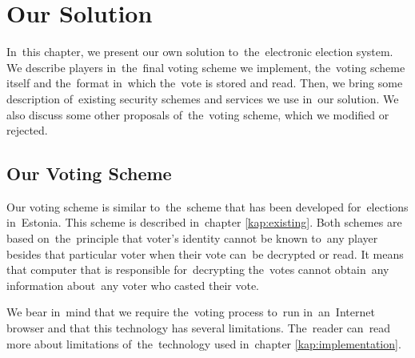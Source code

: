 \chapter{Our Solution}
\label{kap:solution}
In~this chapter, we present our own solution to~the~electronic election system. We describe players in~the~final voting scheme we implement, the~voting scheme itself and the~format in~which the~vote is stored and read. Then, we bring some description of~existing security schemes and services we use in~our solution. We also discuss some other proposals of~the~voting scheme, which we modified or rejected. 

\section{Our Voting Scheme}
Our voting scheme is similar to~the~scheme that has been developed for~elections in~Estonia. This scheme is described in~chapter \ref{kap:existing}. Both schemes are based on~the~principle that voter's identity cannot be known to~any player besides that particular voter when their vote can~be decrypted or read. It means that computer that is responsible for~decrypting the~votes cannot obtain~any information about~any voter who casted their vote. 

We bear in~mind that we require the~voting process to~run in~an~Internet browser and that this technology has several limitations. The~reader can~read more about limitations of~the~technology used in~chapter \ref{kap:implementation}.

